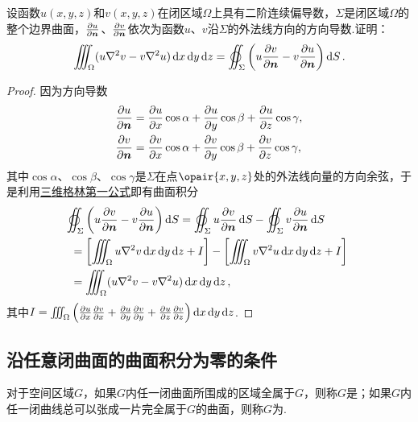 \begin{example}[三维格林第二公式]
设函数\(u(x,y,z)\)和\(v(x,y,z)\)在闭区域\(\Omega\)上具有二阶连续偏导数，\(\Sigma\)是闭区域\(\Omega\)的整个边界曲面，\(\pdv{u}{\boldsymbol{n}}\)、\(\pdv{v}{\boldsymbol{n}}\)依次为函数\(u\)、\(v\)沿\(\Sigma\)的外法线方向的方向导数.证明：
\begin{equation}\label{equation:线积分与面积分.三维格林第二公式}
\iiint_{\Omega} (u \laplacian{v} - v \laplacian{u}) \dd{x}\dd{y}\dd{z}
=\varoiint_{\Sigma} \left( u \pdv{v}{\mat{n}} - v \pdv{u}{\mat{n}} \right) \dd{S}.
\end{equation}
\begin{proof}
\def\Io{\iiint_{\Omega} \left(%
\pdv{u}{x} \pdv{v}{x}%
+\pdv{u}{y} \pdv{v}{y}%
+\pdv{u}{z} \pdv{v}{z}%
\right) \dd{x}\dd{y}\dd{z}}%
因为方向导数\begin{align*}
\pdv{u}{\boldsymbol{n}}
&= \pdv{u}{x} \cos\alpha
+ \pdv{u}{y} \cos\beta
+ \pdv{u}{z} \cos\gamma, \\
\pdv{v}{\boldsymbol{n}}
&= \pdv{v}{x} \cos\alpha
+ \pdv{v}{y} \cos\beta
+ \pdv{v}{z} \cos\gamma,
\end{align*}其中\(\cos\alpha\)、\(\cos\beta\)、\(\cos\gamma\)是\(\Sigma\)在点\(\opair{x,y,z}\)处的外法线向量的方向余弦，于是利用\hyperref[equation:线积分与面积分.三维格林第一公式]{三维格林第一公式}即有曲面积分\begin{align*}
&\hspace{-5pt}\varoiint_{\Sigma} \left( u \pdv{v}{\mat{n}} - v \pdv{u}{\mat{n}} \right) \dd{S}
= \varoiint_{\Sigma} u \pdv{v}{\mat{n}} \dd{S}
- \varoiint_{\Sigma} v \pdv{u}{\mat{n}} \dd{S} \\
&= \left[ \iiint_{\Omega} u \laplacian{v} \dd{x}\dd{y}\dd{z} + I \right]
- \left[ \iiint_{\Omega} v \laplacian{u} \dd{x}\dd{y}\dd{z} + I \right] \\
&= \iiint_{\Omega} (u \laplacian{v} - v \laplacian{u}) \dd{x}\dd{y}\dd{z},
\end{align*}其中\(I = \Io\).
\end{proof}
\end{example}

\subsection{沿任意闭曲面的曲面积分为零的条件}
\begin{definition}
对于空间区域\(G\)，如果\(G\)内任一闭曲面所围成的区域全属于\(G\)，则称\(G\)是；如果\(G\)内任一闭曲线总可以张成一片完全属于\(G\)的曲面，则称\(G\)为.
\end{definition}

